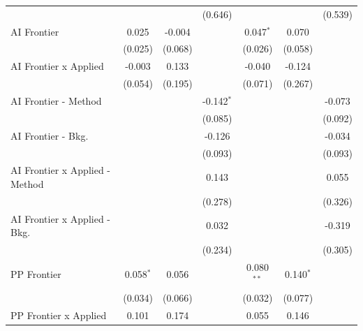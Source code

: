 \begin{tabular}{lcccccc}
                                  &               &               & (0.646)       &               &                & (0.539)\\   
   AI Frontier                    & 0.025         & -0.004        &               & 0.047$^{*}$   & 0.070          &   \\   
                                  & (0.025)       & (0.068)       &               & (0.026)       & (0.058)        &   \\   
   AI Frontier x Applied          & -0.003        & 0.133         &               & -0.040        & -0.124         &   \\   
                                  & (0.054)       & (0.195)       &               & (0.071)       & (0.267)        &   \\   
   AI Frontier - Method           &               &               & -0.142$^{*}$  &               &                & -0.073\\   
                                  &               &               & (0.085)       &               &                & (0.092)\\   
   AI Frontier - Bkg.             &               &               & -0.126        &               &                & -0.034\\   
                                  &               &               & (0.093)       &               &                & (0.093)\\   
   AI Frontier x Applied - Method &               &               & 0.143         &               &                & 0.055\\   
                                  &               &               & (0.278)       &               &                & (0.326)\\   
   AI Frontier x Applied - Bkg.   &               &               & 0.032         &               &                & -0.319\\   
                                  &               &               & (0.234)       &               &                & (0.305)\\   
   PP Frontier                    & 0.058$^{*}$   & 0.056         &               & 0.080$^{**}$  & 0.140$^{*}$    &   \\   
                                  & (0.034)       & (0.066)       &               & (0.032)       & (0.077)        &   \\   
   PP Frontier x Applied          & 0.101         & 0.174         &               & 0.055         & 0.146          &   \\   

\end{tabular}
